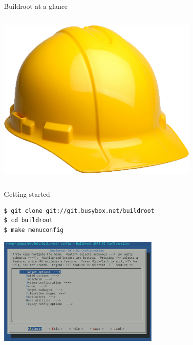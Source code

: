 \documentclass[aspectratio=169,obeyspaces,spaces,hyphens,dvipsnames]{beamer}
\begin{document}
\begin{frame}{Buildroot at a glance}
\begin{columns}
  \includegraphics[width=\textwidth]{logo.png}
\end{columns}
\end{frame}

\begin{frame}[fragile]{Getting started}
  \begin{block}{}
    \begin{verbatim}
$ git clone git://git.busybox.net/buildroot
$ cd buildroot
$ make menuconfig
\end{verbatim}
  \end{block}
  \vspace{0.1cm}
  \begin{center}
    \includegraphics[width=0.6\textwidth]{petazzoni/buildroot-screenshot.png}
  \end{center}
\end{frame}
\end{document}
